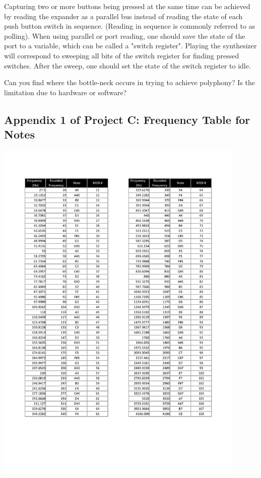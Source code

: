 Capturing two or more buttons being pressed at the same time can be achieved by reading the expander as a parallel bus instead of reading the state of each push button switch in sequence. (Reading in sequence is commonly referred to as polling). When using parallel or port reading, one should save the state of the port to a variable, which can be called a "switch register". Playing the synthesizer will correspond to sweeping all bits of the switch register for finding pressed switches. After the sweep, one should set the state of the switch register to idle.
 
Can you find where the bottle-neck occurs in trying to achieve polyphony? Is the limitation due to hardware or software?




\subsection*{Appendix 1 of Project C: Frequency Table for Notes}
\vspace*{-1.0cm}
\begin{center}                                        
 {\includegraphics[width=0.90\textwidth]{figs/Frequency-table}}
 \end{center}
 
